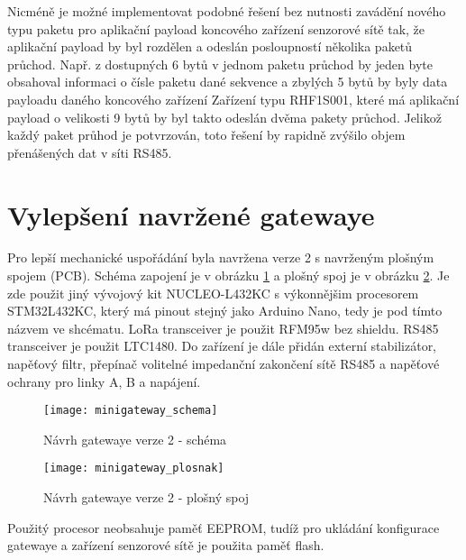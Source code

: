 Nicméně je možné implementovat podobné řešení bez nutnosti zavádění nového typu paketu pro aplikační payload koncového zařízení senzorové sítě tak, že aplikační payload by byl rozdělen a odeslán posloupností několika paketů průchod. 
Např. z dostupných 6 bytů v jednom paketu průchod by jeden byte obsahoval informaci o čísle paketu dané sekvence a zbylých 5 bytů by byly data payloadu daného koncového zařízení Zařízení typu RHF1S001, které má aplikační payload o velikosti 9 bytů by byl takto odeslán dvěma pakety průchod. Jelikož každý paket průhod je potvrzován, toto řešení by rapidně zvýšilo objem přenášených dat v síti RS485.



\section{Vylepšení navržené gatewaye}
Pro lepší mechanické uspořádání byla navržena verze 2 s navrženým plošným spojem (PCB).
Schéma zapojení je v obrázku \ref{fig:minigateway_schema} a plošný spoj je v obrázku \ref{fig:minigateway_plosnak}.
Je zde použit jiný vývojový kit NUCLEO-L432KC s výkonnějšim procesorem STM32L432KC, který má pinout stejný jako Arduino Nano, tedy je pod tímto názvem ve shcématu.
LoRa transceiver je použit RFM95w \cite{RFM95w} bez shieldu.
RS485 transceiver je použit LTC1480. 
Do zařízení je dále přidán externí stabilizátor, napěťový filtr, přepínač volitelné impedanční zakončení sítě RS485 a napěťové ochrany pro linky A, B a napájení. 

\begin{figure}[!h]
    \centering
    \texttt{[image: minigateway\_schema]}
    \caption{Návrh gatewaye verze 2 - schéma}
    \label{fig:minigateway_schema}
\end{figure}

\begin{figure}[!h]
    \centering
    \texttt{[image: minigateway\_plosnak]}
    \caption{Návrh gatewaye verze 2 - plošný spoj}
    \label{fig:minigateway_plosnak}
\end{figure}

Použitý procesor neobsahuje paměť EEPROM, tudíž pro ukládání konfigurace gatewaye a zařízení senzorové sítě je použita paměť flash.



